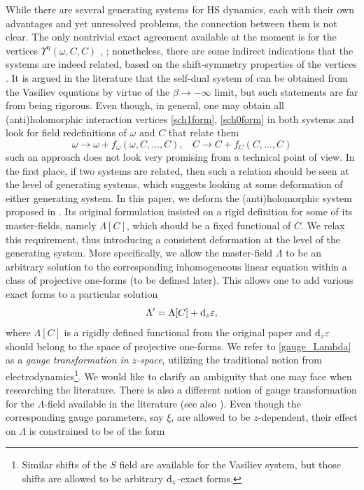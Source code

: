 \documentclass[12pt]{article}
\newcommand{\dr}{{{\rm d}}}
\newcommand{\go}{\omega}
\begin{document}
While there are several generating systems for HS dynamics, each with their own advantages and yet unresolved problems, the connection between them is not clear. The only nontrivial exact agreement available at the moment is for the vertices $\Upsilon^{\eta}(\go,C,C)$ \cite{Didenko:2022qga}, \cite{Korybut:2025vdn}; nonetheless, there are some indirect indications that the systems are indeed related, based on the shift‑symmetry properties of the vertices \cite{Didenko:2022eso}. It is argued in the literature that the self-dual system of \cite{Didenko:2022qga} can be obtained from the Vasiliev equations \cite{Vasiliev:1990en} by virtue of the $\beta\rightarrow-\infty$ limit, but such statements are far from being rigorous. Even though, in general, one may obtain all (anti)holomorphic interaction vertices \eqref{sch1form}, \eqref{sch0form} in both systems and look for field redefinitions of $\go$ and 
$C$ that relate them
\begin{equation}\label{field_redef}
\go\rightarrow\go+f_\go(\go,C,\ldots,C),\:\:\:\: C\rightarrow C+f_C(C,\ldots,C)
\end{equation}
such an approach does not look very promising from a technical point of view. In the first place, if two systems are related, then such a relation should be seen at the level of generating systems, which suggests looking at some deformation of either generating system. In this paper, we deform the (anti)holomorphic system proposed in \cite{Didenko:2022qga}. Its original formulation insisted on a rigid definition for some of its master-fields, namely $\Lambda[C]$, which should be a fixed functional of $C$. We relax this requirement, thus introducing a consistent deformation at the level of the generating system. More specifically, we allow the master-field 
$\Lambda$ to be an arbitrary solution to the corresponding inhomogeneous linear equation within a class of projective one-forms (to be defined later). This allows one to add various exact forms to a particular solution
\begin{equation}\label{gauge_Lambda}
\Lambda^\prime=\Lambda[C]+\dr_z\varepsilon,
\end{equation}
where  $\Lambda[C]$ is a rigidly defined functional from the original paper and $\dr_z \varepsilon$ should belong to the space of projective one-forms. We refer to \eqref{gauge_Lambda} as a {\it gauge transformation in 
$z$-space}, utilizing the traditional notion from electrodynamics\footnote{Similar shifts of the 
$S$ field are available for the Vasiliev system, but those shifts are allowed to be arbitrary $\dr_z$-exact forms.}. We would like to clarify an ambiguity that one may face when researching the literature. There is also a different notion of gauge transformation for the $\Lambda$-field available in the literature \cite{Faliakhov:2026yum} (see also \cite{Didenko:2023vna}). Even though the corresponding gauge parameters, say $\xi$, are allowed to be $z$-dependent, their effect on $\Lambda$ is constrained to be of the form
\end{document}
